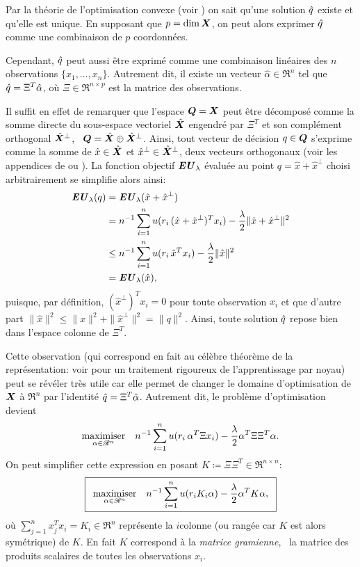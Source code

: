 Par la théorie de l'optimisation convexe (voir \cite{boyd2004convex}) on sait qu'une
solution $\qh$ existe et qu'elle est unique. En supposant que $p = \dim\X$, on peut alors
exprimer $\qh$ comme une combinaison de $p$ coordonnées.

Cependant, $\qh$ peut aussi être exprimé comme une combinaison linéaires des $n$
observations $\{x_1,\ldots,x_n\}$. Autrement dit, il existe un vecteur
$\hat\alpha \in \Re^n$ tel que $\qh = \Xi^T\hat\alpha$, où $\Xi \in \Re^{n \times p}$ est la matrice des
observations.

Il suffit en effet de remarquer que l'espace $\Q = \X$ peut être décomposé comme la somme
directe du sous-espace vectoriel $\hat\X$ engendré par $\Xi^T$ et son complément orthogonal
$\hat\X^\perp$, \ie\ $\Q = \hat\X \oplus \hat\X^\perp$. Ainsi, tout vecteur de décision
$q \in \Q$ s'exprime comme la somme de $\hat x\in\hat\X$ et
$\hat x^\perp \in \hat\X^\perp$, deux vecteurs orthogonaux (voir les appendices de
\cite{boyd2004convex} ou \cite{mohri2012foundations}). La fonction objectif $\EU_\lambda$
évaluée au point $q = \hat x + \hat x^\perp$ choisi arbitrairement se simplifie alors ainsi:
\begin{align}
  \EU_\lambda(q) &= \EU_\lambda(\hat x + \hat x^\perp)\\
           &= n^{-1}\sumi u(r_i\,(\hat x + \hat x^\perp)^Tx_i) - \frac{\lambda}{2}\|\hat x + \hat
             x^\perp\|^2\\
           &\leq n^{-1}\sumi u(r_i\,\hat x^Tx_i) - \frac{\lambda}{2}\|\hat x\|^2\\
           &=\EU_\lambda(\hat x),
\end{align}
puisque, par définition, $(\hat x^\perp)^Tx_i = 0$ pour toute observation $x_i$ et que d'autre
part $\|\hat x\|^2 \leq \|\hat x\|^2+\|\hat x^\perp\|^2 = \|q\|^2$. Ainsi, toute solution
$\qh$ repose bien dans l'espace colonne de $\Xi^T$.

Cette observation (qui correspond en fait au célèbre théorème de la représentation: voir
\cite{scholkopf2001learning} pour un traitement rigoureux de l'apprentissage par noyau)
peut se révéler très utile car elle permet de changer le domaine d'optimisation de $\X$ à
$\Re^n$ par l'identité $\qh = \Xi^T\hat\alpha$. Autrement dit, le problème d'optimisation devient
\begin{equation}
  \maximizeEquation[\alpha \in \Re^n]{n^{-1}\sumi u(r_i\,\alpha^T\Xi x_i) - \frac{\lambda}{2}\alpha^T\Xi\Xi^T\alpha.}
\end{equation}
On peut simplifier cette expression en posant $K \coloneqq \Xi\Xi^T \in \Re^{n \times n}$:
{\begin{equation}
  \boxed{
  \maximizeEquation[\alpha \in \Re^n]{n^{-1}\sumi u(r_iK_i\alpha) - \frac{\lambda}{2}\alpha^TK\alpha,}}
\end{equation}
\vspace{-\baselineskip}}
où $\sum_{j=1}^nx_j^Tx_i = K_i \in \Re^n$ représente la $i$\ieme colonne (ou rangée car
$K$ est alors symétrique) de $K$. En fait $K$ correspond à la \textit{matrice gramienne},
\ie\ la matrice des produits scalaires de toutes les observations $x_i$.

